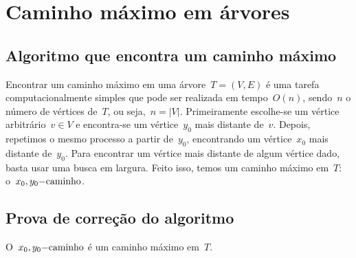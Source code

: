 \section{Caminho máximo em árvores}
\label{sec:caminhoMaximo}
	\subsection{Algoritmo que encontra um caminho máximo}

	Encontrar um caminho máximo em uma árvore~$T=(V,E)$ é uma 
	tarefa computacionalmente simples que pode ser realizada em 
	tempo~$O(n)$, sendo~$n$ o número de vértices de~$T$, ou 
	seja,~${n =|V|}$. 
	Primeiramente escolhe-se um vértice arbitrário~$v \in V$ e 
	encontra-se um vértice~$y_0$ mais distante de~$v$.
	Depois, repetimos o mesmo processo a partir de~$y_0$, 
	encontrando um vértice~$x_0$ mais distante de~$y_0$. 
	Para encontrar um vértice mais distante de algum vértice dado, 
	basta usar uma busca em largura.  
	Feito isso, temos um caminho máximo em~$T$: o~$x_0,y_0\mathrm{-caminho}$.

	\bigskip

	\subsection{Prova de correção do algoritmo}

	\begin{lem}
	\label{lema:caminhoMax}
		O~$x_0,y_0\mathrm{-caminho}$ é um caminho máximo em~$T$.
	\end{lem}

	\bigskip


